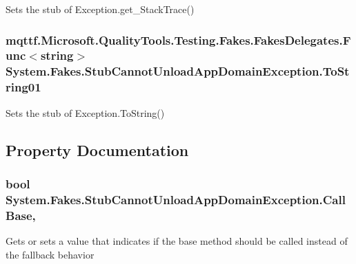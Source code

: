Sets the stub of Exception.\-get\-\_\-\-Stack\-Trace()

\hypertarget{class_system_1_1_fakes_1_1_stub_cannot_unload_app_domain_exception_aca6ade54c0ec84835773dd71a575edc8}{
\subsubsection[{To\-String01}]{\setlength{\rightskip}{0pt plus 5cm}mqttf.\-Microsoft.\-Quality\-Tools.\-Testing.\-Fakes.\-Fakes\-Delegates.\-Func$<$string$>$ System.\-Fakes.\-Stub\-Cannot\-Unload\-App\-Domain\-Exception.\-To\-String01}}\label{class_system_1_1_fakes_1_1_stub_cannot_unload_app_domain_exception_aca6ade54c0ec84835773dd71a575edc8}


Sets the stub of Exception.\-To\-String()



\subsection{Property Documentation}
\hypertarget{class_system_1_1_fakes_1_1_stub_cannot_unload_app_domain_exception_ae4e83fdfad0bc3066a87e4abf4c0432b}{
\subsubsection[{Call\-Base}]{\setlength{\rightskip}{0pt plus 5cm}bool System.\-Fakes.\-Stub\-Cannot\-Unload\-App\-Domain\-Exception.\-Call\-Base\hspace{0.3cm}{\ttfamily [get]}, {\ttfamily [set]}}}\label{class_system_1_1_fakes_1_1_stub_cannot_unload_app_domain_exception_ae4e83fdfad0bc3066a87e4abf4c0432b}


Gets or sets a value that indicates if the base method should be called instead of the fallback behavior

